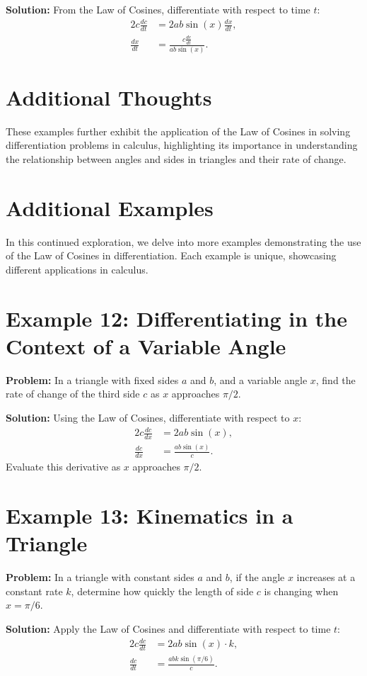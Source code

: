 \documentclass[a4paper,12pt]{book}
\newcounter{problem}
\newcounter{example}
\begin{document}
\textbf{Solution:}
From the Law of Cosines, differentiate with respect to time $t$:
\begin{align*}
2c \frac{dc}{dt} &= 2ab \sin(x) \frac{dx}{dt}, \\
\frac{dx}{dt} &= \frac{c \frac{dc}{dt}}{ab \sin(x)}.
\end{align*}

\section*{Additional Thoughts}
These examples further exhibit the application of the Law of Cosines in solving differentiation problems in calculus, highlighting its importance in understanding the relationship between angles and sides in triangles and their rate of change.

\section*{Additional Examples}
In this continued exploration, we delve into more examples demonstrating the use of the Law of Cosines in differentiation. Each example is unique, showcasing different applications in calculus.

\section*{Example 12: Differentiating in the Context of a Variable Angle}
\textbf{Problem:} In a triangle with fixed sides $a$ and $b$, and a variable angle $x$, find the rate of change of the third side $c$ as $x$ approaches $\pi/2$.

\textbf{Solution:}
Using the Law of Cosines, differentiate with respect to $x$:
\begin{align*}
2c \frac{dc}{dx} &= 2ab \sin(x), \\
\frac{dc}{dx} &= \frac{ab \sin(x)}{c}.
\end{align*}
Evaluate this derivative as $x$ approaches $\pi/2$.

\section*{Example 13: Kinematics in a Triangle}
\textbf{Problem:} In a triangle with constant sides $a$ and $b$, if the angle $x$ increases at a constant rate $k$, determine how quickly the length of side $c$ is changing when $x = \pi/6$.

\textbf{Solution:}
Apply the Law of Cosines and differentiate with respect to time $t$:
\begin{align*}
2c \frac{dc}{dt} &= 2ab \sin(x) \cdot k, \\
\frac{dc}{dt} &= \frac{abk \sin(\pi/6)}{c}.
\end{align*}
\end{document}
